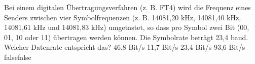     {Bei einem digitalen Übertragungsverfahren (z. B. FT4) wird die Frequenz eines Senders zwischen vier Symbolfrequenzen (z. B. 14081,20 kHz, 14081,40 kHz, 14081,61 kHz und 14081,83 kHz) umgetastet, so dass pro Symbol zwei Bit (00, 01, 10 oder 11) übertragen werden können. Die Symbolrate beträgt 23,4 baud. Welcher Datenrate entspricht das?}
    {46,8 Bit/s}
    {11,7 Bit/s}
    {23,4 Bit/s}
    {93,6 Bit/s}
    {false}{false}